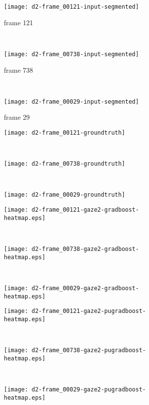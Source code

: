 \begin{figure}[ht]
	\centering
	\begin{subfigure}[h]{0.32\textwidth}
	\texttt{[image: d2-frame\_00121-input-segmented]}	
		\caption*{frame 121}
	\end{subfigure}
	~
	\begin{subfigure}[h]{0.32\textwidth}
	\texttt{[image: d2-frame\_00738-input-segmented]}	
		\caption*{frame 738}
	\end{subfigure}
	~
	\begin{subfigure}[h]{0.32\textwidth}
	\texttt{[image: d2-frame\_00029-input-segmented]}	
		\caption*{frame 29}
	\end{subfigure}
	
	\vspace{3mm}
	\begin{subfigure}[h]{0.32\textwidth}
	\texttt{[image: d2-frame\_00121-groundtruth]}	
	\end{subfigure}
	~
	\begin{subfigure}[h]{0.32\textwidth}
	\texttt{[image: d2-frame\_00738-groundtruth]}	
	\end{subfigure}
	~
	\begin{subfigure}[h]{0.32\textwidth}
	\texttt{[image: d2-frame\_00029-groundtruth]}	
	\end{subfigure}
	
	\vspace{3mm}
	\begin{subfigure}[h]{0.32\textwidth}
	\texttt{[image: d2-frame\_00121-gaze2-gradboost-heatmap.eps]}	
	\end{subfigure}
	~
	\begin{subfigure}[h]{0.32\textwidth}
	\texttt{[image: d2-frame\_00738-gaze2-gradboost-heatmap.eps]}
	\end{subfigure}
	~	
	\begin{subfigure}[h]{0.32\textwidth}
	\texttt{[image: d2-frame\_00029-gaze2-gradboost-heatmap.eps]}	
	\end{subfigure}
	
	\vspace{3mm}
	\begin{subfigure}[h]{0.32\textwidth}
	\texttt{[image: d2-frame\_00121-gaze2-pugradboost-heatmap.eps]}	
	\end{subfigure}
	~
	\begin{subfigure}[h]{0.32\textwidth}
	\texttt{[image: d2-frame\_00738-gaze2-pugradboost-heatmap.eps]}	
	\end{subfigure}
	~	
	\begin{subfigure}[h]{0.32\textwidth}
	\texttt{[image: d2-frame\_00029-gaze2-pugradboost-heatmap.eps]}	
	\end{subfigure}	
	

\end{figure}
